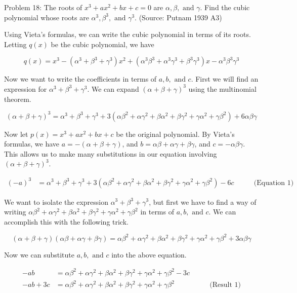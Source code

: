 Problem 18: The roots of $x^3 + ax^2 + bx + c = 0$ are $\alpha, \beta, \text{ and } \gamma$. Find the cubic polynomial whose roots are $\alpha^3, \beta^3, \text{ and } \gamma^3$. (Source: Putnam 1939 A3)

Using Vieta's formulas, we can write the cubic polynomial in terms of its roots. Letting $q(x)$ be the cubic polynomial, we have

$$ q(x) = x^3 - (\alpha^3 + \beta^3 + \gamma^3) x^2 + (\alpha^3 \beta^3 + \alpha^3 \gamma^3 + \beta^3 \gamma^3) x - \alpha^3 \beta^3 \gamma^3 $$

Now we want to write the coefficients in terms of $a, b, \text{ and } c$. First we will find an expression for $\alpha^3 + \beta^3 + \gamma^3$. We can expand $(\alpha + \beta + \gamma)^3$ using the multinomial theorem.

$$ (\alpha + \beta + \gamma)^3 = \alpha^3 + \beta^3 + \gamma^3 + 3(\alpha \beta^2 + \alpha \gamma^2 + \beta \alpha^2 + \beta \gamma^2 + \gamma \alpha^2 + \gamma \beta^2) + 6 \alpha \beta \gamma $$

Now let $p(x) = x^3 + ax^2 + bx + c$ be the original polynomial. By Vieta's formulas, we have $a = -(\alpha + \beta + \gamma)$, and $b = \alpha \beta + \alpha \gamma + \beta \gamma$, and $c = -\alpha \beta \gamma$. This allows us to make many substitutions in our equation involving $(\alpha + \beta + \gamma)^3$.

\begin{align*}
(-a)^3 &= \alpha^3 + \beta^3 + \gamma^3 + 3(\alpha \beta^2 + \alpha \gamma^2 + \beta \alpha^2 + \beta \gamma^2 + \gamma \alpha^2 + \gamma \beta^2) - 6c & \qquad \text{(Equation 1)}
\end{align*}

We want to isolate the expression $\alpha^3 + \beta^3 + \gamma^3$, but first we have to find a way of writing $\alpha \beta^2 + \alpha \gamma^2 + \beta \alpha^2 + \beta \gamma^2 + \gamma \alpha^2 + \gamma \beta^2$ in terms of $a, b, \text{ and } c$. We can accomplish this with the following trick.

$$ (\alpha + \beta + \gamma)(\alpha \beta + \alpha \gamma + \beta \gamma) = \alpha \beta^2 + \alpha \gamma^2 + \beta \alpha^2 + \beta \gamma^2 + \gamma \alpha^2 + \gamma \beta^2 + 3 \alpha \beta \gamma $$

Now we can substitute $a, b, \text{ and } c$ into the above equation.

\begin{align*}
-ab &= \alpha \beta^2 + \alpha \gamma^2 + \beta \alpha^2 + \beta \gamma^2 + \gamma \alpha^2 + \gamma \beta^2 - 3c \\
-ab + 3c &= \alpha \beta^2 + \alpha \gamma^2 + \beta \alpha^2 + \beta \gamma^2 + \gamma \alpha^2 + \gamma \beta^2 & \qquad \text{(Result 1)}
\end{align*}

